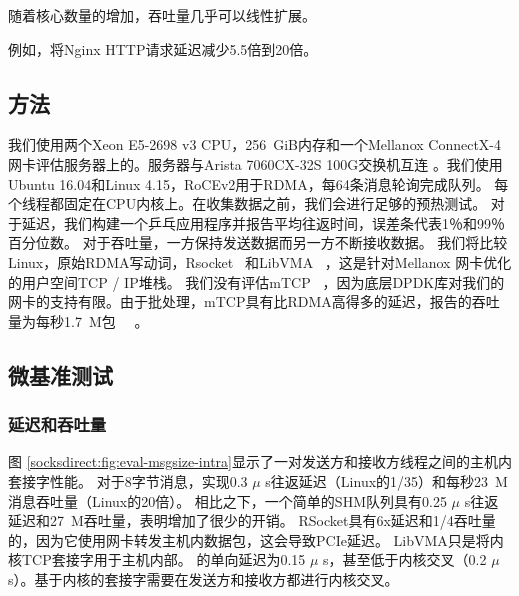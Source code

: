 

随着核心数量的增加，吞吐量几乎可以线性扩展。


例如，\sys  {}将Nginx HTTP请求延迟减少5.5倍到20倍。


\subsection{方法}
\label{socksdirect:subsec:methodology}

我们使用两个Xeon E5-2698 v3 CPU，256~GiB内存和一个Mellanox ConnectX-4网卡评估服务器上的\sys 。服务器与Arista 7060CX-32S 100G交换机互连 \cite {arista-7060cx}。我们使用Ubuntu 16.04和Linux 4.15，RoCEv2用于RDMA，每64条消息轮询完成队列。
每个线程都固定在CPU内核上。在收集数据之前，我们会进行足够的预热测试。
对于延迟，我们构建一个乒乓应用程序并报告平均往返时间，误差条代表1％和99％百分位数。
对于吞吐量，一方保持发送数据而另一方不断接收数据。
我们将比较Linux，原始RDMA写动词，Rsocket~ \cite {rsockets}和LibVMA~ \cite {libvma}，这是针对Mellanox 网卡优化的用户空间TCP / IP堆栈。
我们没有评估mTCP~ \cite {jeong2014mtcp}，因为底层DPDK库对我们的网卡的支持有限。由于批处理，mTCP具有比RDMA高得多的延迟，报告的吞吐量为每秒1.7~M包~~ \cite {kalia2018datacenter}。

\subsection{微基准测试}
\label{socksdirect:subsec:microbenchmark}

\subsubsection{延迟和吞吐量}



图 \ref {socksdirect:fig:eval-msgsize-intra}显示了一对发送方和接收方线程之间的主机内套接字性能。
对于8字节消息，\sys 实现0.3 $ \mu $ s往返延迟（Linux的1/35）和每秒23~M消息吞吐量（Linux的20倍）。
相比之下，一个简单的SHM队列具有0.25 $ \mu $ s往返延迟和27~M吞吐量，表明\sys 增加了很少的开销。
RSocket具有6x延迟和1/4吞吐量的\sys  {}，因为它使用网卡转发主机内数据包，这会导致PCIe延迟。
LibVMA只是将内核TCP套接字用于主机内部。
\sys  {}的单向延迟为0.15 $ \mu $ s，甚至低于内核交叉（0.2 $ \mu $ s）。基于内核的套接字需要在发送方和接收方都进行内核交叉。

